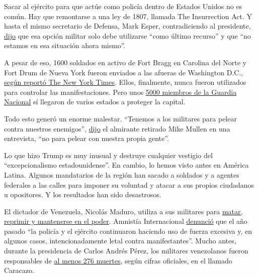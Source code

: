 Sacar al ejército para que actúe como policía dentro de Estados Unidos
no es común. Hay que remontarse a una ley de 1807, llamada The
Insurrection Act. Y hasta el mismo secretario de Defensa, Mark Esper,
contradiciendo al presidente,
\href{https://www.nytimes.com/video/us/politics/100000007172076/esper-trump-protests-troops.html?playlistId=video/latest-video}{dijo}
que esa opción militar solo debe utilizarse ``como último recurso'' y
que ``no estamos en esa situación ahora mismo''.

A pesar de eso, 1600 soldados en activo de Fort Bragg en Carolina del
Norte y Fort Drum de Nueva York fueron enviados a las afueras de
Washington D.C.,
\href{https://www.nytimes.com/2020/06/04/us/politics/trump-troops-washington-pentagon.html}{según
reportó The New York Times}. Ellos, finalmente, nunca fueron utilizados
para controlar las manifestaciones. Pero unos
\href{https://www.nytimes.com/2020/06/07/us/politics/trump-military-troops-protests.html}{5000
miembros de la Guardia Nacional} sí llegaron de varios estados a
proteger la capital.

Todo esto generó un enorme malestar. ``Tenemos a los militares para
pelear contra nuestros enemigos'',
\href{https://www.nytimes.com/2020/06/07/us/politics/trump-military-troops-protests.html}{dijo}
el almirante retirado Mike Mullen en una entrevista, ``no para pelear
con nuestra propia gente''.

Lo que hizo Trump es muy inusual y destruye cualquier vestigio del
``excepcionalismo estadounidense''. En cambio, lo hemos visto antes en
América Latina. Algunos mandatarios de la región han sacado a soldados y
a agentes federales a las calles para imponer su voluntad y atacar a sus
propios ciudadanos u opositores. Y los resultados han sido desastrosos.

El dictador de Venezuela, Nicolás Maduro, utiliza a sus militares para
\href{https://www.nytimes.com/es/2019/07/05/espanol/america-latina/venezuela-faes-derechos-humanos.html}{matar,
reprimir y mantenerse en el poder}. Amnistía Internacional
\href{https://www.amnesty.org/es/countries/americas/venezuela/report-venezuela/}{denunció}
que el año pasado ``la policía y el ejército continuaron haciendo uso de
fuerza excesiva y, en algunos casos, intencionadamente letal contra
manifestantes''. Mucho antes, durante la presidencia de Carlos Andrés
Pérez, los militares venezolanos fueron responsables de
\href{https://www.bbc.com/mundo/noticias-america-latina-47379668}{al
menos 276 muertes}, según cifras oficiales, en el llamado Caracazo.

